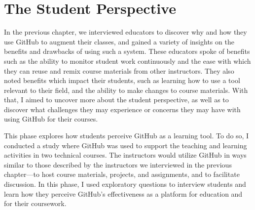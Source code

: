 








\chapter{The Student Perspective}

In the previous chapter, we interviewed educators to discover why and how they use GitHub to augment their classes, and gained a variety of insights on the benefits and drawbacks of using such a system. These educators spoke of benefits such as the ability to monitor student work continuously and the ease with which they can reuse and remix course materials from other instructors. They also noted benefits which impact their students, such as learning how to use a tool relevant to their field, and the ability to make changes to course materials. With that, I aimed to uncover more about the student perspective, as well as to discover what challenges they may experience or concerns they may have with using GitHub for their courses. %

This phase explores how students perceive GitHub as a learning tool. To do so, I conducted a study where GitHub was used to support the teaching and learning activities in two technical courses. The instructors would utilize GitHub in ways similar to those described by the instructors we interviewed in the previous chapter---to host course materials, projects, and assignments, and to facilitate discussion. In this phase, I used exploratory questions to interview students and learn how they perceive GitHub's effectiveness as a platform for education and for their coursework.

